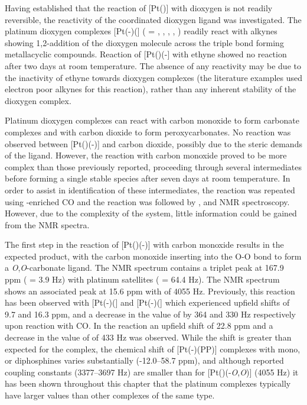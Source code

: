 Having established that the reaction of [Pt(\tButhixantphos)] with dioxygen is not readily reversible, the reactivity of the coordinated dioxygen ligand was investigated.  The platinum dioxygen complexes [Pt(-)(] ( = , , , , ) readily react with alkynes showing 1,2-addition of the dioxygen molecule across the triple bond forming metallacyclic compounds\cite{Clark1978}.  Reaction of [Pt(\tButhixantphos)(-] with ethyne showed no reaction after two days at room temperature.  The absence of any reactivity may be due to the inactivity of ethyne towards dioxygen complexes (the literature examples used electron poor alkynes for this reaction), rather than any inherent stability of the dioxygen complex.

Platinum dioxygen complexes can react with carbon monoxide to form carbonate complexes and with carbon dioxide to form peroxycarbonates.\cite{Goel1983b}  No reaction was observed between [Pt(\tButhixantphos)(-)] and carbon dioxide, possibly due to the steric demands of the \tButhixantphos{} ligand.  However, the reaction with carbon monoxide proved to be more complex than those previously reported, proceeding through several intermediates before forming a single stable species after seven days at room temperature.  In order to assist in identification of these intermediates, the reaction was repeated using \carbon{}-enriched CO and the reaction was followed by \proton{}, \carbon{} and \phosphorus{} NMR spectroscopy.  However, due to the complexity of the system, little information could be gained from the \proton{} NMR spectra.  

The first step in the reaction of [Pt(\tButhixantphos)(-)] with carbon monoxide results in the expected product, with the carbon monoxide inserting into the O-O bond to form a \emph{O},\emph{O}-carbonate ligand.  The \carbon{} NMR spectrum contains a triplet peak at 167.9 ppm (\JPC{} = 3.9 Hz) with platinum satellites (\JPtC{} = 64.4 Hz).  The \phosphorus{} NMR spectrum shows an associated peak at 15.6 ppm with \JPtP{} of 4055 Hz.  Previously, this reaction has been observed with [Pt(-)(] and [Pt(-)(] which experienced upfield shifts of 9.7 and 16.3 ppm, and a decrease in the value of \JPtP{} by 364 and 330 Hz respectively upon reaction with CO.\cite{Goel1983b}  In the \tButhixantphos{} reaction an upfield shift of 22.8 ppm and a decrease in the value of \JPtP{} of 433 Hz was observed.  While the shift is greater than expected for the \tButhixantphos{} complex, the chemical shift of [Pt(-)(PP)] complexes with mono, or diphosphines varies substantially (-12.0--58.7 ppm), and although reported coupling constants (3377--3697 Hz)\cite{Goel1983b, Pregosin2012} are smaller than for [Pt(\tButhixantphos)(-\emph{O},\emph{O})] (4055 Hz) it has been shown throughout this chapter that the \tBuxantphos{} platinum complexes typically have larger \JPtP{} values than other complexes of the same type.


